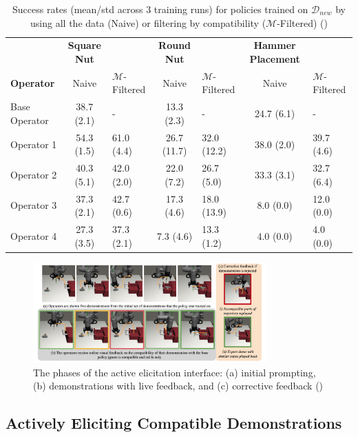 \documentclass[
  letterpaper,
  DIV=11,
  numbers=noendperiod,
  oneside]{scrreprt}
\theoremstyle{remark}
\begin{document}
\label{fig:m_filter_table}
\begin{longtable}[]{@{}lclclcl@{}}
\caption{Success rates (mean/std across 3 training runs) for policies
trained on \(\mathcal{D}_{new}\) by using all the data (Naive) or
filtering by compatibility (\(\mathcal{M}\)-Filtered)
()}\tabularnewline
\toprule\noalign{}
\endfirsthead
\endhead
\bottomrule\noalign{}
\endlastfoot
& \textbf{Square Nut} & & \textbf{Round Nut} & & \textbf{Hammer
Placement} & \\
\textbf{Operator} & Naive & \(\mathcal{M}\)-Filtered & Naive &
\(\mathcal{M}\)-Filtered & Naive & \(\mathcal{M}\)-Filtered \\
Base Operator & 38.7 (2.1) & - & 13.3 (2.3) & - & 24.7 (6.1) & - \\
Operator 1 & 54.3 (1.5) & 61.0 (4.4) & 26.7 (11.7) & 32.0 (12.2) & 38.0
(2.0) & 39.7 (4.6) \\
Operator 2 & 40.3 (5.1) & 42.0 (2.0) & 22.0 (7.2) & 26.7 (5.0) & 33.3
(3.1) & 32.7 (6.4) \\
Operator 3 & 37.3 (2.1) & 42.7 (0.6) & 17.3 (4.6) & 18.0 (13.9) & 8.0
(0.0) & 12.0 (0.0) \\
Operator 4 & 27.3 (3.5) & 37.3 (2.1) & 7.3 (4.6) & 13.3 (1.2) & 4.0
(0.0) & 4.0 (0.0) \\
\end{longtable}

\begin{figure}

{\centering \includegraphics[width=0.8\textwidth,height=\textheight]{src/Figures/active_elicitation.png}

}

\caption{The phases of the active elicitation interface: (a) initial
prompting, (b) demonstrations with live feedback, and (c) corrective
feedback ()}

\end{figure}%

\subsection{Actively Eliciting Compatible
Demonstrations}\label{actively-eliciting-compatible-demonstrations}
\end{document}
